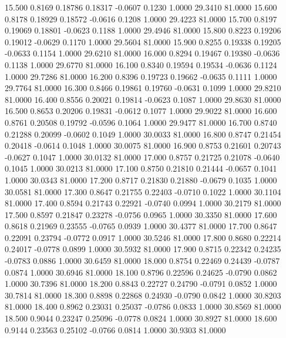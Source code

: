   15.500   0.8169   0.18786   0.18317  -0.0607   0.1230   1.0000  29.3410  81.0000
  15.600   0.8178   0.18929   0.18572  -0.0616   0.1208   1.0000  29.4223  81.0000
  15.700   0.8197   0.19069   0.18801  -0.0623   0.1188   1.0000  29.4946  81.0000
  15.800   0.8223   0.19206   0.19012  -0.0629   0.1170   1.0000  29.5604  81.0000
  15.900   0.8255   0.19338   0.19205  -0.0633   0.1154   1.0000  29.6210  81.0000
  16.000   0.8294   0.19467   0.19380  -0.0636   0.1138   1.0000  29.6770  81.0000
  16.100   0.8340   0.19594   0.19534  -0.0636   0.1124   1.0000  29.7286  81.0000
  16.200   0.8396   0.19723   0.19662  -0.0635   0.1111   1.0000  29.7764  81.0000
  16.300   0.8466   0.19861   0.19760  -0.0631   0.1099   1.0000  29.8210  81.0000
  16.400   0.8556   0.20021   0.19814  -0.0623   0.1087   1.0000  29.8630  81.0000
  16.500   0.8653   0.20206   0.19831  -0.0612   0.1077   1.0000  29.9022  81.0000
  16.600   0.8761   0.20508   0.19792  -0.0596   0.1064   1.0000  29.9477  81.0000
  16.700   0.8740   0.21288   0.20099  -0.0602   0.1049   1.0000  30.0033  81.0000
  16.800   0.8747   0.21454   0.20418  -0.0614   0.1048   1.0000  30.0075  81.0000
  16.900   0.8753   0.21601   0.20743  -0.0627   0.1047   1.0000  30.0132  81.0000
  17.000   0.8757   0.21725   0.21078  -0.0640   0.1045   1.0000  30.0213  81.0000
  17.100   0.8750   0.21810   0.21444  -0.0657   0.1041   1.0000  30.0343  81.0000
  17.200   0.8717   0.21830   0.21880  -0.0679   0.1035   1.0000  30.0581  81.0000
  17.300   0.8647   0.21755   0.22403  -0.0710   0.1022   1.0000  30.1104  81.0000
  17.400   0.8594   0.21743   0.22921  -0.0740   0.0994   1.0000  30.2179  81.0000
  17.500   0.8597   0.21847   0.23278  -0.0756   0.0965   1.0000  30.3350  81.0000
  17.600   0.8618   0.21969   0.23555  -0.0765   0.0939   1.0000  30.4377  81.0000
  17.700   0.8647   0.22091   0.23794  -0.0772   0.0917   1.0000  30.5246  81.0000
  17.800   0.8680   0.22214   0.24017  -0.0778   0.0899   1.0000  30.5932  81.0000
  17.900   0.8715   0.22342   0.24235  -0.0783   0.0886   1.0000  30.6459  81.0000
  18.000   0.8754   0.22469   0.24439  -0.0787   0.0874   1.0000  30.6946  81.0000
  18.100   0.8796   0.22596   0.24625  -0.0790   0.0862   1.0000  30.7396  81.0000
  18.200   0.8843   0.22727   0.24790  -0.0791   0.0852   1.0000  30.7814  81.0000
  18.300   0.8898   0.22868   0.24930  -0.0790   0.0842   1.0000  30.8203  81.0000
  18.400   0.8962   0.23031   0.25037  -0.0786   0.0833   1.0000  30.8569  81.0000
  18.500   0.9044   0.23247   0.25096  -0.0778   0.0824   1.0000  30.8927  81.0000
  18.600   0.9144   0.23563   0.25102  -0.0766   0.0814   1.0000  30.9303  81.0000
